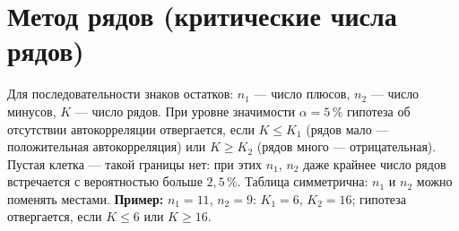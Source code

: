 \documentclass[12pt,a4paper]{article}
\begin{document}
\clearpage
\section{Метод рядов (критические числа рядов)}
\noindent Для последовательности знаков остатков: $n_1$ — число плюсов,
$n_2$ — число минусов, $K$ — число рядов. При уровне значимости
$\alpha = 5\,\%$ гипотеза об отсутствии автокорреляции отвергается, если
$K \le K_1$ (рядов мало — положительная автокорреляция) или $K \ge K_2$
(рядов много — отрицательная). Пустая клетка — такой границы нет: при
этих $n_1$, $n_2$ даже крайнее число рядов встречается с вероятностью
больше $2{,}5\,\%$. Таблица симметрична: $n_1$ и $n_2$ можно поменять местами.
\textbf{Пример:} $n_1 = 11$, $n_2 = 9$: $K_1 = 6$, $K_2 = 16$; гипотеза
отвергается, если $K \le 6$ или $K \ge 16$.
\par\medskip{}
\end{document}

